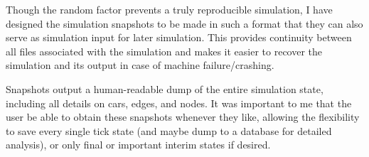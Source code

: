 \par Though the random factor prevents a truly reproducible simulation, I have designed the simulation snapshots to be made in such a format that they can also serve as simulation input for later simulation.  This provides continuity between all files associated with the simulation and makes it easier to recover the simulation and its output in case of machine failure/crashing. \\

\par Snapshots output a human-readable dump of the entire simulation state, including all details on cars, edges, and nodes.  It was important to me that the user be able to obtain these snapshots whenever they like, allowing the flexibility to save every single tick state (and maybe dump to a database for detailed analysis), or only final or important interim states if desired.